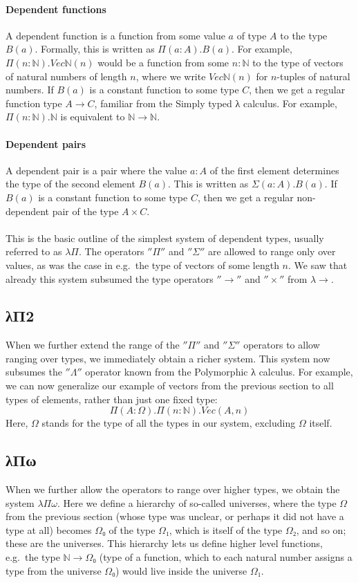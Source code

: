 \documentclass[12pt]{article}
\begin{document}
\paragraph{Dependent functions}
A dependent function is a function from some value $a$ of type $A$ to the type $B(a)$. Formally, this is written as $Π(a:A).B(a)$. For example, $Π(n:ℕ).Vecℕ(n)$ would be a function from some $n:ℕ$ to the type of vectors of natural numbers of length $n$, where we write $Vecℕ(n)$ for $n$-tuples of natural numbers. If $B(a)$ is a constant function to some type $C$, then we get a regular function type $A → C$, familiar from the Simply typed λ calculus. For example, $Π(n:ℕ).ℕ $ is equivalent to $ℕ → ℕ$.

\paragraph{Dependent pairs}
A dependent pair is a pair where the value $a:A$ of the first element determines the type of the second element $B(a)$. This is written as $Σ(a:A).B(a)$. If $B(a)$ is a constant function to some type $C$, then we get a regular non-dependent pair of the type $A × C$.

\paragraph{}
This is the basic outline of the simplest system of dependent types, usually referred to as $λΠ$. The operators $''Π''$ and $''Σ''$ are allowed to range only over values, as was the case in e.g.~the type of vectors of some length $n$. We saw that already this system subsumed the type operators $''→''$ and $''×''$ from $λ→$.

\subsection{λΠ2}
When we further extend the range of the $''Π''$ and $''Σ''$ operators to allow ranging over types, we immediately obtain a richer system. This system now subsumes the $''Λ''$ operator known from the Polymorphic λ calculus. For example, we can now generalize our example of vectors from the previous section to all types of elements, rather than just one fixed type:
$$ Π(A:Ω).Π(n:ℕ).Vec(A, n) $$
Here, $Ω$ stands for the type of all the types in our system, excluding $Ω$ itself.

\subsection{λΠω}
When we further allow the operators to range over higher types, we obtain the system $λΠω$. Here we define a hierarchy of so-called universes, where the type $Ω$ from the previous section (whose type was unclear, or perhaps it did not have a type at all) becomes $Ω₀$ of the type $Ω₁$, which is itself of the type $Ω₂$, and so on; these are the universes. This hierarchy lets us define higher level functions, e.g.~the type $ℕ → Ω₀$ (type of a function, which to each natural number assigns a type from the universe $Ω₀$) would live inside the universe $Ω₁$.
\end{document}
